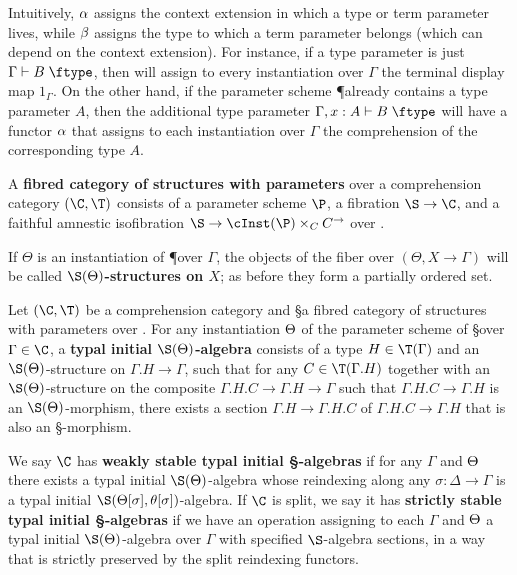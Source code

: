 \begin{enumerate}
\begin{enumerate}
Intuitively, $\alpha$ assigns the context extension in which a type or term parameter lives, while $\beta$ assigns the type to which a term parameter belongs (which can depend on the context extension).
For instance, if a type parameter is just $\Gamma\types B\type$, then \al will assign to every instantiation over $\Gamma$ the terminal display map $1_\Gamma$.
On the other hand, if the parameter scheme \P already contains a type parameter $A$, then the additional type parameter $\Gamma,x:A \types B\type$ will have a functor $\alpha$ that assigns to each instantiation over $\Gamma$ the comprehension of the corresponding type $A$.

\begin{defn}
  A \textbf{fibred category of structures with parameters} over a comprehension category $(\C,\T)$ consists of a parameter scheme $\P$, a fibration $\S\to \C$, and a faithful amnestic isofibration $\S \to \cInst(\P)\times_C C^\to$ over \C.
\end{defn}

If $\Theta$ is an instantiation of \P over $\Gamma$, the objects of the fiber over $(\Theta,X\to\Gamma)$ will be called \textbf{$\S(\Th)$-structures on $X$}; as before they form a partially ordered set.

\begin{defn}
  Let $(\C,\T)$ be a comprehension category and \S a fibred category of structures with parameters over \C.
  For any instantiation $\Theta$ of the parameter scheme of \S over $\Gamma\in \C$, a \textbf{typal initial $\S(\Th)$-algebra} consists of a type $H\in\T(\Gamma)$ and an $\S(\Th)$-structure on $\Gamma.H\to \Gamma$, such that for any $C\in\T(\Gamma.H)$ together with an $\S(\Th)$-structure on the composite $\Gamma.H.C\to\Gamma.H\to\Gamma$ such that $\Gamma.H.C\to\Gamma.H$ is an $\S(\Th)$-morphism, there exists a section $\Gamma.H \to \Gamma.H.C$ of $\Gamma.H.C\to\Gamma.H$ that is also an \S-morphism.

  We say $\C$ has \textbf{weakly stable typal initial \S-algebras} if for any $\Gamma$ and $\Theta$ there exists a typal initial $\S(\Th)$-algebra whose reindexing along any $\sigma:\Delta\to\Gamma$ is a typal initial $\S(\Theta[\sigma],\theta[\sigma])$-algebra.
  If $\C$ is split, we say it has \textbf{strictly stable typal initial \S-algebras} if we have an operation assigning to each $\Gamma$ and $\Theta$ a typal initial $\S(\Th)$-algebra over $\Gamma$ with specified $\S$-algebra sections, in a way that is strictly preserved by the split reindexing functors.
\end{defn}


\end{enumerate}
\end{enumerate}
